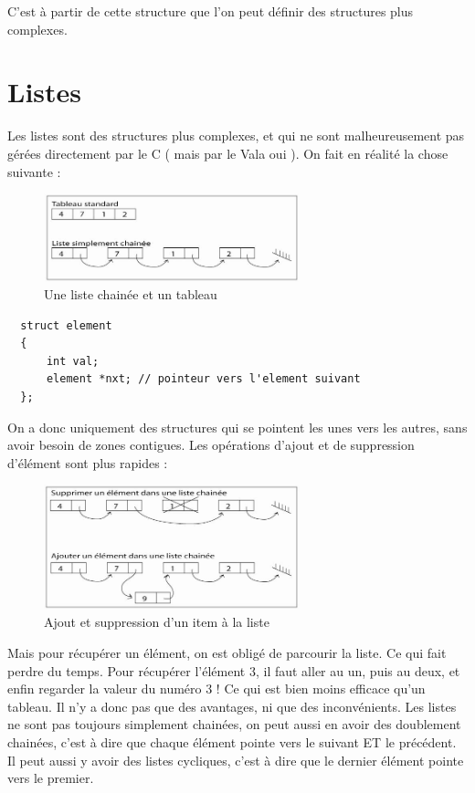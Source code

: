 C'est à partir de cette structure que l'on peut définir des structures plus complexes.

\section{Listes}
\label{DefListe}
Les listes sont des structures plus complexes, et qui ne sont malheureusement pas gérées directement par le C ( mais par le Vala oui ).
On fait en réalité la chose suivante : 
\begin{figure}[H]
	\begin{center}
	  \includegraphics[width=20em]{Annexes/Images/liste.jpg}
	\end{center}
	\caption{Une liste chainée et un tableau}
\end{figure}
\begin{lstlisting}
  struct element
  {
      int val;
      element *nxt; // pointeur vers l'element suivant
  };
\end{lstlisting}

On a donc uniquement des structures qui se pointent les unes vers les autres, sans avoir besoin de zones contigues. Les opérations d'ajout et de suppression d'élément sont plus rapides : 
\begin{figure}[H]
	\begin{center}
	  \includegraphics[width=20em]{Annexes/Images/liste_ajout.jpg}
	\end{center}
	\caption{Ajout et suppression d'un item à la liste}
\end{figure}

Mais pour récupérer un élément, on est obligé de parcourir la liste. Ce qui fait perdre du temps. Pour récupérer l'élément 3, il faut aller au un, puis au deux, et enfin regarder la valeur du numéro 3 !
Ce qui est bien moins efficace qu'un tableau. Il n'y a donc pas que des avantages, ni que des inconvénients. Les listes ne sont pas toujours simplement chainées, on peut aussi en avoir des doublement chainées, c'est à dire que chaque élément pointe vers le suivant ET le précédent. Il peut aussi y avoir des listes cycliques, c'est à dire que le dernier élément pointe vers le premier.
